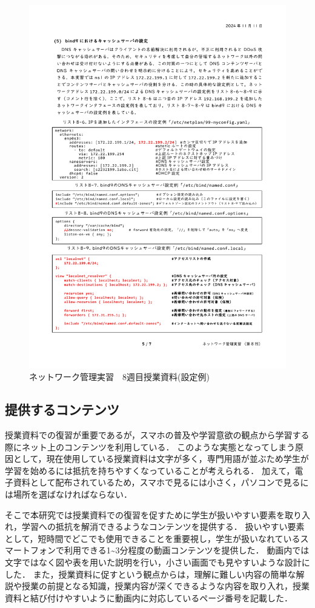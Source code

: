 \documentclass[12pt,a4j,titlepage]{ltjsarticle}
\begin{document}
\begin{figure}[!htb]
  \centering
  \includegraphics[width=12cm]{8週目2.pdf}
  \caption{ネットワーク管理実習　8週目授業資料(設定例)}
  \label{fig:8no2}
\end{figure}

\clearpage

\subsection{提供するコンテンツ}
授業資料での復習が重要であるが，スマホの普及や学習意欲の観点から学習する際にネット上のコンテンツを利用している．
このような実態となってしまう原因として，現在使用している授業資料は文字が多く，専門用語が並ぶため学生が学習を始めるには抵抗を持ちやすくなっていることが考えられる．
加えて，電子資料として配布されているため，スマホで見るには小さく，パソコンで見るには場所を選ばなければならない．

そこで本研究では授業資料での復習を促すために学生が扱いやすい要素を取り入れ，学習への抵抗を解消できるようなコンテンツを提供する．
扱いやすい要素として，短時間でどこでも使用できることを重要視し，学生が扱いなれているスマートフォンで利用できる1\textasciitilde3分程度の動画コンテンツを提供した．
動画内では文字ではなく図や表を用いた説明を行い，小さい画面でも見やすいような設計にした．
また，授業資料に促すという観点からは，理解に難しい内容の簡単な解説や授業の前提となる知識，授業内容が深くできるような内容を取り入れ，授業資料と結び付けやすいように動画内に対応しているページ番号を記載した．
\end{document}
